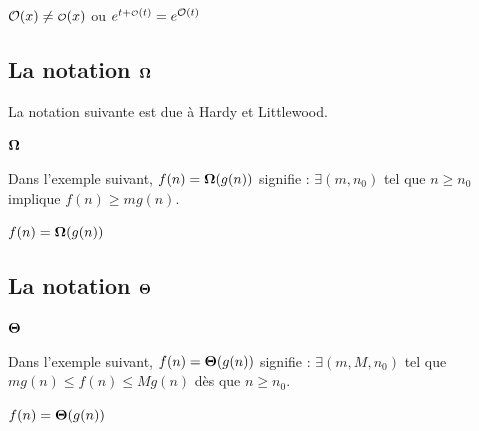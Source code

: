 \documentclass[12pt,a4paper]{book}
\makeatletter
\theoremstyle{definition}
\newcounter{paraexample}[subsubsection]
\newcommand\@newexample@abstract[2]{%
	\paragraph{%
		#1%
		\if\relax\detokenize{#2}\relax\else {} -- #2\fi%
	}%
}
\newcommand\newparaexample{\@ifstar{\@newparaexample@star}{\@newparaexample@no@star}}
\newcommand\@newparaexample@no@star[1]{%
	\refstepcounter{paraexample}%
	\@newexample@abstract{Exemple \theparaexample}{#1}%
}
\newcommand\@newparaexample@star[1]{%
	\@newexample@abstract{Exemple}{#1}%
}
\makeatother
\begin{document}
{{\begin{latexex}
$\bigO{x} \neq \smallO{x}$ ou
$e^{t + \smallO{t}} = e^{\bigO{t}}$
\end{latexex}




\subsection{\texorpdfstring{La notation $\bigomega{}$}%
                           {La notation "grand Omega"}}

\newparaexample{}

La notation suivante est due à Hardy et Littlewood.

\begin{latexex}
$\bigomega{}$
\end{latexex}




\newparaexample{}

Dans l'exemple suivant, $f(n) = \bigomega{g(n)}$ signifie :
$\exists (m, n_0)$ tel que $n \geq n_0$ implique $f(n) \geq m g(n)$.

\begin{latexex}
$f(n) = \bigomega{g(n)}$
\end{latexex}




\subsection{\texorpdfstring{La notation $\bigtheta{}$}%
                           {La notation "grand Theta"}}

\newparaexample{}

\begin{latexex}
$\bigtheta{}$
\end{latexex}




\newparaexample{}

Dans l'exemple suivant, $f(n) = \bigtheta{g(n)}$ signifie : $\exists (m, M, n_0)$ tel que $m g(n) \leq f(n) \leq M g(n)$ dès que $n \geq n_0$.

\begin{latexex}
$f(n) = \bigtheta{g(n)}$
\end{latexex}


}}
\end{document}
